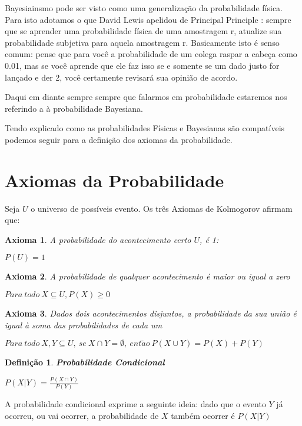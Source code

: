 Bayesiainsmo pode ser visto como uma generalização da probabilidade física. Para isto adotamos o que David Lewis apelidou de Principal Principle \cite{lewis80}: sempre que se aprender uma probabilidade física de uma amostragem r, atualize sua probabilidade subjetiva para aquela amostragem r. Basicamente isto é senso comum: pense que para você a  probabilidade de um colega raspar a cabeça como 0.01, mas se você aprende que ele faz isso se e somente se um dado justo for lançado e der 2, você certamente revisará sua opinião de acordo.

Daqui em diante sempre sempre que falarmos em probabilidade estaremos nos referindo a à probabilidade Bayesiana.

Tendo explicado como as probabilidades Físicas e Bayesianas são compatíveis podemos seguir para a definição dos axiomas da probabilidade. 


\section{Axiomas da Probabilidade}
Seja $U$ o universo de possíveis evento. Os três Axiomas de Kolmogorov \cite{kolmogorov33} afirmam que:

\newtheorem{kolg1}{Axioma}[chapter]
\newtheorem{kolg2}[kolg1]{Axioma}
\newtheorem{kolg3}[kolg1]{Axioma}
\begin{kolg1}
	A probabilidade do acontecimento certo $U$, é 1:
	
	\centering $P(U) = 1$
\end{kolg1}
 

\begin{kolg2}
	A probabilidade de qualquer acontecimento é maior ou igual a zero 
	
	\centering $Para\ todo\ X \subseteq U, P(X) \ge 0$
\end{kolg2}


\begin{kolg3}
	Dados dois acontecimentos disjuntos, a probabilidade da sua união é igual à soma das probabilidades de cada um 
	
	\centering $Para\ todo\ X, Y \subseteq U,\ se\ X \cap Y = \emptyset,\ ent\tilde{a}o\ P(X \cup Y) = P(X) + P(Y)$
\end{kolg3}

\newtheorem{cond_prob}{Definição}[chapter]
\begin{cond_prob}
	\textbf{Probabilidade Condicional}
	
	\centering $P(X|Y) = \frac{P(X \cap Y)}{P(Y)}$
\end{cond_prob}
A probabilidade condicional exprime a seguinte ideia: dado que o evento $Y$ já ocorreu, ou vai ocorrer, a probabilidade de $X$ também ocorrer é $P(X|Y)$

